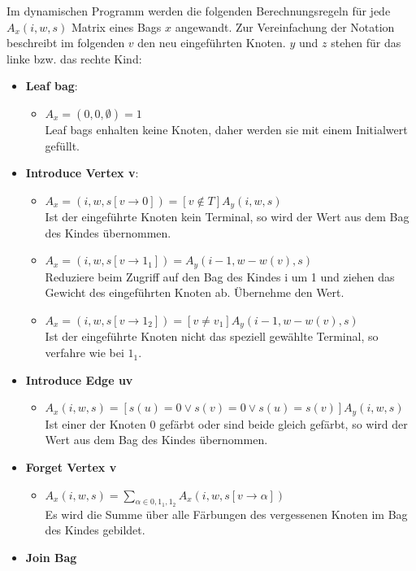 Im dynamischen Programm werden die folgenden Berechnungsregeln für jede $A_x(i,w,s)$ Matrix eines Bags $x$ angewandt. Zur Vereinfachung der Notation beschreibt im folgenden $v$ den neu eingeführten Knoten. $y$ und $z$ stehen für das linke bzw. das rechte Kind:
\begin{itemize}
\item \textbf{Leaf bag}:
\begin{itemize}
\item $A_x=(0,0,\emptyset) = 1$\\Leaf bags enhalten keine Knoten, daher werden sie mit einem Initialwert gefüllt.
\end{itemize}
\item \textbf{Introduce Vertex v}:
\begin{itemize}
\item $A_x=(i,w,s[v\rightarrow 0]) = [v \notin T]A_y(i,w,s)$\\ Ist der eingeführte Knoten kein Terminal, so wird der Wert aus dem Bag des Kindes übernommen.
\item $A_x=(i,w,s[v\rightarrow 1_1]) = A_y(i-1,w-w(v),s)$\\ Reduziere beim Zugriff auf den Bag des Kindes i um 1 und ziehen das Gewicht des eingeführten Knoten ab. Übernehme den Wert.
\item $A_x=(i,w,s[v\rightarrow 1_2]) =[v \neq v_1] A_y(i-1,w-w(v),s)$\\ Ist der eingeführte Knoten nicht das speziell gewählte Terminal, so verfahre wie bei $1_1$.
\end{itemize}
\item \textbf{Introduce Edge uv}
\begin{itemize}
\item $A_x(i,w,s) = [s(u) = 0 \vee s(v) = 0 \vee s(u) = s(v)]A_y(i,w,s)$\\ Ist einer der Knoten $0$ gefärbt oder sind beide gleich gefärbt, so wird der Wert aus dem Bag des Kindes übernommen.
\end{itemize}
\item \textbf{Forget Vertex v}
\begin{itemize}
\item $A_x(i,w,s) = \sum\limits_{\alpha \in {0,1_1,1_2}} A_x(i,w,s[v \rightarrow \alpha]) $\\ Es wird die Summe  über alle Färbungen des vergessenen Knoten im Bag des Kindes gebildet.
\end{itemize}
\item \textbf{Join Bag}
\begin{itemize}

\end{itemize}
\end{itemize}
